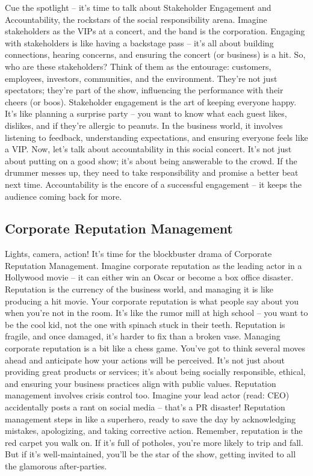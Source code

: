 \documentclass[
  letterpaper,
  DIV=11,
  numbers=noendperiod]{scrreprt}
\begin{document}
Cue the spotlight -- it's time to talk about Stakeholder Engagement and
Accountability, the rockstars of the social responsibility arena.
Imagine stakeholders as the VIPs at a concert, and the band is the
corporation. Engaging with stakeholders is like having a backstage pass
-- it's all about building connections, hearing concerns, and ensuring
the concert (or business) is a hit. So, who are these stakeholders?
Think of them as the entourage: customers, employees, investors,
communities, and the environment. They're not just spectators; they're
part of the show, influencing the performance with their cheers (or
boos). Stakeholder engagement is the art of keeping everyone happy. It's
like planning a surprise party -- you want to know what each guest
likes, dislikes, and if they're allergic to peanuts. In the business
world, it involves listening to feedback, understanding expectations,
and ensuring everyone feels like a VIP. Now, let's talk about
accountability in this social concert. It's not just about putting on a
good show; it's about being answerable to the crowd. If the drummer
messes up, they need to take responsibility and promise a better beat
next time. Accountability is the encore of a successful engagement -- it
keeps the audience coming back for more.

\subsection{Corporate Reputation
Management}\label{corporate-reputation-management}

Lights, camera, action! It's time for the blockbuster drama of Corporate
Reputation Management. Imagine corporate reputation as the leading actor
in a Hollywood movie -- it can either win an Oscar or become a box
office disaster. Reputation is the currency of the business world, and
managing it is like producing a hit movie. Your corporate reputation is
what people say about you when you're not in the room. It's like the
rumor mill at high school -- you want to be the cool kid, not the one
with spinach stuck in their teeth. Reputation is fragile, and once
damaged, it's harder to fix than a broken vase. Managing corporate
reputation is a bit like a chess game. You've got to think several moves
ahead and anticipate how your actions will be perceived. It's not just
about providing great products or services; it's about being socially
responsible, ethical, and ensuring your business practices align with
public values. Reputation management involves crisis control too.
Imagine your lead actor (read: CEO) accidentally posts a rant on social
media -- that's a PR disaster! Reputation management steps in like a
superhero, ready to save the day by acknowledging mistakes, apologizing,
and taking corrective action. Remember, reputation is the red carpet you
walk on. If it's full of potholes, you're more likely to trip and fall.
But if it's well-maintained, you'll be the star of the show, getting
invited to all the glamorous after-parties.
\end{document}
